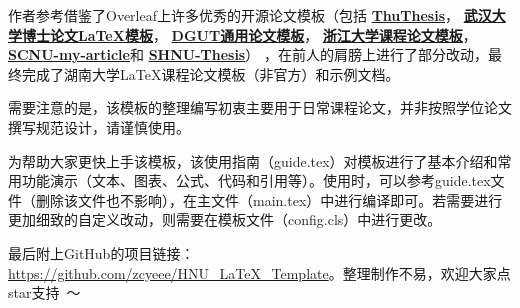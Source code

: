 \documentclass[
    report,     %
    oneside,    %
    UTF8,       %
    zihao=-4    %
]{config} %
\begin{document}
\begin{abstractCN}[0.6cm] %

作者参考借鉴了Overleaf上许多优秀的开源论文模板（包括
\href{https://github.com/tuna/thuthesis}{\textbf{ThuThesis}}，
\href{http://aff.whu.edu.cn/huangzh/}{\textbf{武汉大学博士论文\LaTeX{}模板}}，
\href{https://www.overleaf.com/latex/templates/dguttong-yong-lun-wen-slash-bao-gao-slash-zuo-ye-mo-ban-fei-guan-fang/gkymcyhwhjhj}{\textbf{DGUT通用论文模板}}，
\href{https://www.overleaf.com/latex/templates/zhe-jiang-da-xue-ke-cheng-lun-wen-mo-ban/mjpzqvgsmdzn}{\textbf{浙江大学课程论文模板}}，
\href{https://www.overleaf.com/latex/templates/scnu-my-article/jkbbvhnddtsw}{\textbf{SCNU-my-article}}和
\href{https://www.overleaf.com/latex/templates/shnu-thesis/wsykzrksspgn}{\textbf{SHNU-Thesis}}）
，在前人的肩膀上进行了部分改动，最终完成了湖南大学\LaTeX{}课程论文模板（非官方）和示例文档。

需要注意的是，该模板的整理编写初衷主要用于日常课程论文，并非按照学位论文撰写规范设计，请谨慎使用。

为帮助大家更快上手该模板，该使用指南（guide.tex）对模板进行了基本介绍和常用功能演示（文本、图表、公式、代码和引用等）。使用时，可以参考guide.tex文件（删除该文件也不影响），在主文件（main.tex）中进行编译即可。若需要进行更加细致的自定义改动，则需要在模板文件（config.cls）中进行更改。


最后附上GitHub的项目链接：\url{https://github.com/zcyeee/HNU_LaTeX_Template}。整理制作不易，欢迎大家点star支持\ ～


\def\keywordsCN{关键词1；关键词2；关键词3；关键词4；关键词5}

\end{abstractCN}

\end{document}
